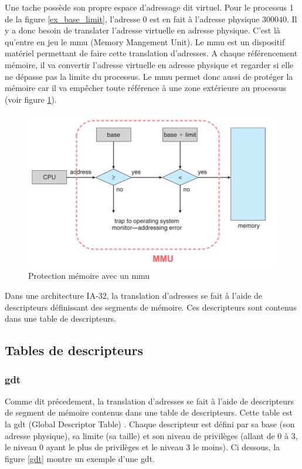 \documentclass[a4paper]{article}
\begin{document}
Une tache possède son propre espace d'adressage dit virtuel. Pour le processus 1
de la figure \ref{ex_base_limit}, l'adresse $0$ est en fait à l'adresse physique
$300040$. Il y a donc besoin de translater l'adresse virtuelle en adresse physique.
C'est là qu'entre en jeu le \acrshort{mmu} (Memory Mangement Unit). Le \acrshort{mmu}
est un dispositif matériel permettant de faire cette translation d'adresses. A chaque
référencement mémoire, il va convertir l'adresse virtuelle en adresse physique et
regarder si elle ne dépasse pas la limite du processus. Le \acrshort{mmu} permet donc
aussi de protéger la mémoire car il va empêcher toute référence à une zone extérieure
au processus (voir figure \ref{mmu}).

\begin{figure}[!h]
  \centering
  \includegraphics[scale=0.75]{images/mmu.png}
  \caption{Protection mémoire avec un \acrshort{mmu}}
  \label{mmu}
\end{figure}

Dans une architecture \acrshort{IA-32}, la translation d'adresses se fait à l'aide
de descripteurs définissant des segments de mémoire. Ces descripteurs sont contenus
dans une table de descripteurs.


\subsection{Tables de descripteurs}
\subsubsection{\acrshort{gdt}}
Comme dit précedement, la translation d'adresses se fait à l'aide de descripteurs
de segment de mémoire contenus dans une table de descripteurs. Cette table est
la \acrshort{gdt} (Global Descriptor Table) \cite{ref14}. Chaque descripteur est défini par sa
base (son adresse physique), sa limite (sa taille) et son niveau de privilèges
(allant de 0 à 3, le niveau 0 ayant le plus de privilèges et le niveau 3 le moins).
Ci dessous, la figure \ref{gdt} montre un exemple d'une \acrshort{gdt}.
\end{document}

